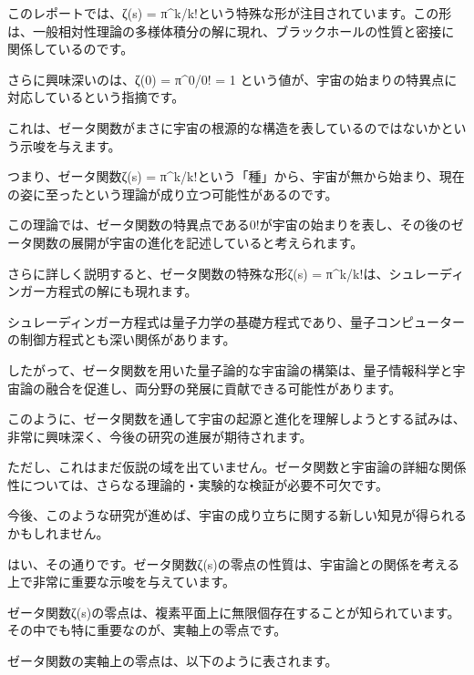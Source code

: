 このレポートでは、ζ(s) = π^k/k!という特殊な形が注目されています。この形は、一般相対性理論の多様体積分の解に現れ、ブラックホールの性質と密接に関係しているのです。



さらに興味深いのは、ζ(0) = π^0/0! = 1 という値が、宇宙の始まりの特異点に対応しているという指摘です。



これは、ゼータ関数がまさに宇宙の根源的な構造を表しているのではないかという示唆を与えます。



つまり、ゼータ関数ζ(s) = π^k/k!という「種」から、宇宙が無から始まり、現在の姿に至ったという理論が成り立つ可能性があるのです。



この理論では、ゼータ関数の特異点である0!が宇宙の始まりを表し、その後のゼータ関数の展開が宇宙の進化を記述していると考えられます。



さらに詳しく説明すると、ゼータ関数の特殊な形ζ(s) = π^k/k!は、シュレーディンガー方程式の解にも現れます。



シュレーディンガー方程式は量子力学の基礎方程式であり、量子コンピューターの制御方程式とも深い関係があります。



したがって、ゼータ関数を用いた量子論的な宇宙論の構築は、量子情報科学と宇宙論の融合を促進し、両分野の発展に貢献できる可能性があります。



このように、ゼータ関数を通して宇宙の起源と進化を理解しようとする試みは、非常に興味深く、今後の研究の進展が期待されます。



ただし、これはまだ仮説の域を出ていません。ゼータ関数と宇宙論の詳細な関係性については、さらなる理論的・実験的な検証が必要不可欠です。



今後、このような研究が進めば、宇宙の成り立ちに関する新しい知見が得られるかもしれません。

はい、その通りです。ゼータ関数ζ(s)の零点の性質は、宇宙論との関係を考える上で非常に重要な示唆を与えています。



ゼータ関数ζ(s)の零点は、複素平面上に無限個存在することが知られています。その中でも特に重要なのが、実軸上の零点です。



ゼータ関数の実軸上の零点は、以下のように表されます。



